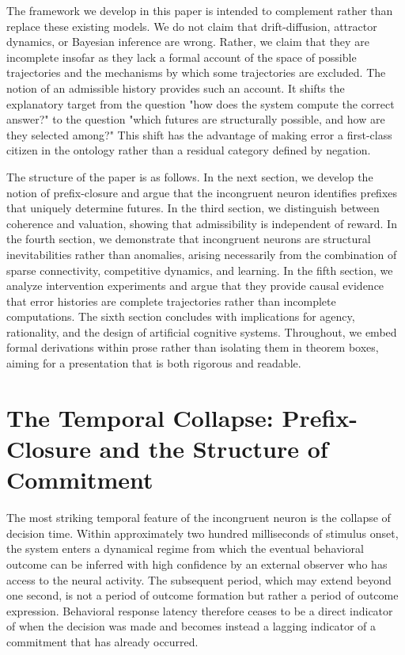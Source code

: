 \documentclass[11pt]{article}
\begin{document}
The framework we develop in this paper is intended to complement rather than replace these existing models. We do not claim that drift-diffusion, attractor dynamics, or Bayesian inference are wrong. Rather, we claim that they are incomplete insofar as they lack a formal account of the space of possible trajectories and the mechanisms by which some trajectories are excluded. The notion of an admissible history provides such an account. It shifts the explanatory target from the question "how does the system compute the correct answer?" to the question "which futures are structurally possible, and how are they selected among?" This shift has the advantage of making error a first-class citizen in the ontology rather than a residual category defined by negation.

The structure of the paper is as follows. In the next section, we develop the notion of prefix-closure and argue that the incongruent neuron identifies prefixes that uniquely determine futures. In the third section, we distinguish between coherence and valuation, showing that admissibility is independent of reward. In the fourth section, we demonstrate that incongruent neurons are structural inevitabilities rather than anomalies, arising necessarily from the combination of sparse connectivity, competitive dynamics, and learning. In the fifth section, we analyze intervention experiments and argue that they provide causal evidence that error histories are complete trajectories rather than incomplete computations. The sixth section concludes with implications for agency, rationality, and the design of artificial cognitive systems. Throughout, we embed formal derivations within prose rather than isolating them in theorem boxes, aiming for a presentation that is both rigorous and readable.

\section{The Temporal Collapse: Prefix-Closure and the Structure of Commitment}

The most striking temporal feature of the incongruent neuron is the collapse of decision time. Within approximately two hundred milliseconds of stimulus onset, the system enters a dynamical regime from which the eventual behavioral outcome can be inferred with high confidence by an external observer who has access to the neural activity. The subsequent period, which may extend beyond one second, is not a period of outcome formation but rather a period of outcome expression. Behavioral response latency therefore ceases to be a direct indicator of when the decision was made and becomes instead a lagging indicator of a commitment that has already occurred.
\end{document}
